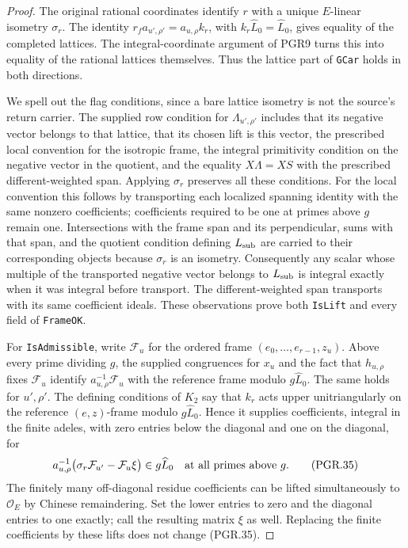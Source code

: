 \begin{proof}
The original rational coordinates identify \(r\) with a unique
\(E\)-linear isometry \(\sigma_r\).  The identity
\(r_f a_{u',\rho'}=a_{u,\rho}k_r\), with
\(k_r\widehat L_0=\widehat L_0\), gives equality of the
completed lattices.  The integral-coordinate argument of PGR9 turns
this into equality of the rational lattices themselves.  Thus the
lattice part of \texttt{GCar} holds in both directions.

We spell out the flag conditions, since a bare lattice isometry is
not the source's return carrier.  The supplied row condition for
\(\Lambda_{u',\rho'}\) includes that its negative vector belongs
to that lattice, that its chosen lift is this vector, the prescribed
local convention for the isotropic frame, the integral primitivity
condition on the negative vector in the quotient, and the equality
\(X\Lambda=XS\) with the prescribed different-weighted span.
Applying \(\sigma_r\) preserves all these conditions.  For the
local convention this follows by transporting each localized spanning
identity with the same nonzero coefficients; coefficients required
to be one at primes above \(g\) remain one.  Intersections with
the frame span and its perpendicular, sums with that span, and the
quotient condition defining \(L_{\rm sub}\) are carried to their
corresponding objects because \(\sigma_r\) is an isometry.
Consequently any scalar whose multiple of the transported negative
vector belongs to \(L_{\rm sub}\) is integral exactly when it was
integral before transport.  The different-weighted span transports
with its same coefficient ideals.  These observations prove both
\texttt{IsLift} and every field of \texttt{FrameOK}.

For \texttt{IsAdmissible}, write \(\mathcal F_u\) for the
ordered frame \((e_0,\ldots,e_{r-1},z_u)\).  Above every prime
dividing \(g\), the supplied congruences for \(x_u\) and the
fact that \(h_{u,\rho}\) fixes \(\mathcal F_u\) identify
\(a_{u,\rho}^{-1}\mathcal F_u\) with the reference frame
modulo \(g\widehat L_0\).  The same holds for \(u',\rho'\).
The defining conditions of \(K_2\) say that \(k_r\) acts
upper unitriangularly on the reference \((e,z)\)-frame modulo
\(g\widehat L_0\).  Hence it supplies coefficients, integral
in the finite adeles, with zero entries below the diagonal and one
on the diagonal, for
\[
 a_{u,\rho}^{-1}
       \bigl(\sigma_r\mathcal F_{u'}-\mathcal F_u\xi\bigr)
                 \in g\widehat L_0
                        \quad\hbox{at all primes above }g.
\tag{PGR.35}
\]
The finitely many off-diagonal residue coefficients can be lifted
simultaneously to \(\mathcal O_E\) by Chinese remaindering.
Set the lower entries to zero and the diagonal entries to one
exactly; call the resulting matrix \(\xi\) as well.  Replacing
the finite coefficients by these lifts does not change (PGR.35).


\end{proof}
